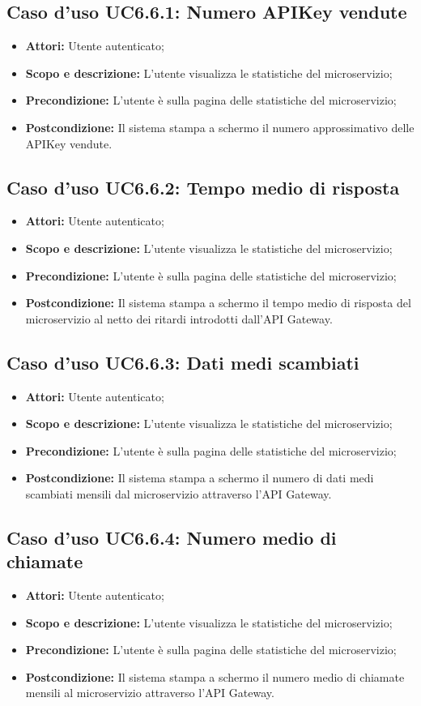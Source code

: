 \documentclass[12pt,a4paper,titlepage]{article}
\begin{document}
\subsection{Caso d'uso UC6.6.1: Numero APIKey vendute}
\begin{itemize}
	\item \textbf{Attori: }Utente autenticato;
	\item \textbf{Scopo e descrizione: }L'utente visualizza le statistiche del microservizio;
	\item \textbf{Precondizione: }L'utente è sulla pagina delle statistiche del microservizio;
	\item \textbf{Postcondizione: }Il sistema stampa a schermo il numero approssimativo delle APIKey vendute.
\end{itemize}
\subsection{Caso d'uso UC6.6.2: Tempo medio di risposta}
\begin{itemize}
	\item \textbf{Attori: }Utente autenticato;
	\item \textbf{Scopo e descrizione: }L'utente visualizza le statistiche del microservizio;
	\item \textbf{Precondizione: }L'utente è sulla pagina delle statistiche del microservizio;
	\item \textbf{Postcondizione: }Il sistema stampa a schermo il tempo medio di risposta del microservizio al netto dei ritardi introdotti dall'API Gateway.
\end{itemize}
\subsection{Caso d'uso UC6.6.3: Dati medi scambiati}
\begin{itemize}
	\item \textbf{Attori: }Utente autenticato;
	\item \textbf{Scopo e descrizione: }L'utente visualizza le statistiche del microservizio;
	\item \textbf{Precondizione: }L'utente è sulla pagina delle statistiche del microservizio;
	\item \textbf{Postcondizione: }Il sistema stampa a schermo il numero di dati medi scambiati mensili dal microservizio attraverso l'API Gateway.
\end{itemize}
\subsection{Caso d'uso UC6.6.4: Numero medio di chiamate}
\begin{itemize}
	\item \textbf{Attori: }Utente autenticato;
	\item \textbf{Scopo e descrizione: }L'utente visualizza le statistiche del microservizio;
	\item \textbf{Precondizione: }L'utente è sulla pagina delle statistiche del microservizio;
	\item \textbf{Postcondizione: }Il sistema stampa a schermo il numero medio di chiamate mensili al microservizio attraverso l'API Gateway.
\end{itemize}
\end{document}
